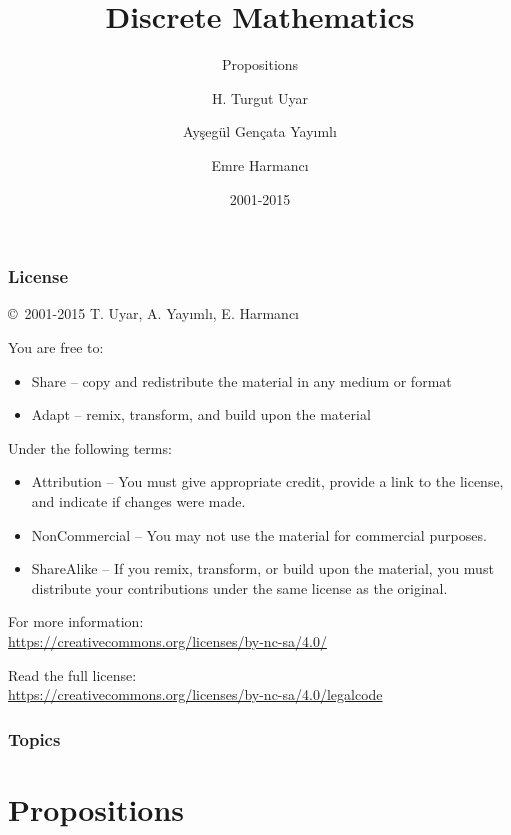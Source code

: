 \documentclass[dvipsnames]{beamer}
\title{Discrete Mathematics}
\subtitle{Propositions}
\author{H. Turgut Uyar \and Ayşegül Gençata Yayımlı \and Emre Harmancı}
\date{2001-2015}
\begin{document}
\begin{frame}
  \titlepage
\end{frame}

\begin{frame}
  \frametitle{License}

  \hfill
  \copyright~2001-2015 T. Uyar, A. Yayımlı, E. Harmancı

  \vfill
  \begin{footnotesize}
    You are free to:
    \begin{itemize}
      \itemsep0em
      \item Share -- copy and redistribute the material in any medium or format
      \item Adapt -- remix, transform, and build upon the material
    \end{itemize}

    Under the following terms:
    \begin{itemize}
      \itemsep0em
      \item Attribution -- You must give appropriate credit, provide a link to
        the license, and indicate if changes were made.

      \item NonCommercial -- You may not use the material for commercial
        purposes.

      \item ShareAlike -- If you remix, transform, or build upon the material,
        you must distribute your contributions under the same license as the
        original.
    \end{itemize}
  \end{footnotesize}

  \begin{small}
    For more information:\\
    \url{https://creativecommons.org/licenses/by-nc-sa/4.0/}

    \smallskip
    Read the full license:\\
    \url{https://creativecommons.org/licenses/by-nc-sa/4.0/legalcode}
  \end{small}
\end{frame}

\begin{frame}
  \frametitle{Topics}
  \tableofcontents
\end{frame}

\section{Propositions}
\end{document}
